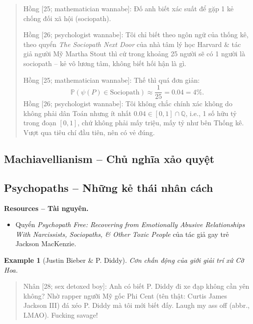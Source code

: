 \documentclass[12pt,oneside]{book}
\newtheorem{example}{Example}
\begin{document}
\begin{quote}
	{\sf Hồng [25; mathematician wannabe]}: Đố anh biết xác suất để gặp 1 kẻ chống đối xã hội (sociopath).
	
	{\sf Hồng [26; psychologist wannabe]}: Tôi chỉ biết theo ngôn ngữ của thống kê, theo quyển {\it The Sociopath Next Door} của nhà tâm lý học Harvard \& tác giả người Mỹ {\sc Martha Stout} thì cứ trong khoảng 25 người sẽ có 1 người là sociopath -- kẻ vô lương tâm, không biết hối hận là gì.
	
	{\sf Hồng [25; mathematician wannabe]}: Thế thì quá đơn giản:
	\begin{equation*}
		\mathbb{P}(\psi(P)\in\mbox{Sociopath})\approx\frac{1}{25} = 0.04 = 4\%.
	\end{equation*}
	{\sf Hồng [26; psychologist wannabe]}: Tôi không chắc chính xác không do không phải dân Toán nhưng ít nhất $0.04\in[0,1]\cap\mathbb{Q}$, i.e., 1 số hữu tỷ trong đoạn $[0,1]$, chứ không phải mấy triệu, mấy tỷ như bên Thống kê. Vượt qua tiêu chí đầu tiên, nên có vẻ đúng.
\end{quote}

\subsection{Machiavellianism -- Chủ nghĩa xảo quyệt}

\subsection{Psychopaths -- Những kẻ thái nhân cách}
{\bf \textsf{Resources -- Tài nguyên.}}
\begin{itemize}
	\item Quyển {\it Psychopath Free: Recovering from Emotionally Abusive Relationships With Narcissists, Sociopaths, \& Other Toxic People} \cite{MacKenzie2015} của tác giả gay trẻ {\sc Jackson MacKenzie}.
\end{itemize}

\begin{example}[{\sc Justin Bieber} \& {\sc P. Diddy}]
	Cơn chấn động của giới giải trí xứ Cờ Hoa.
\end{example}

\begin{quote}
	{\sf Nhân [28; sex detoxed boy]}: Anh có biết {\sc P. Diddy} đi xe đạp không cần yên không? Nhờ rapper ngưỡi Mỹ gốc Phi { Cent} (tên thật: {\sc Curtis James Jackson III}) đá xéo {\sc P. Diddy} mà tôi mới biết đấy. Laugh my ass off (abbr., LMAO). Fucking savage!
\end{quote}
\end{document}
